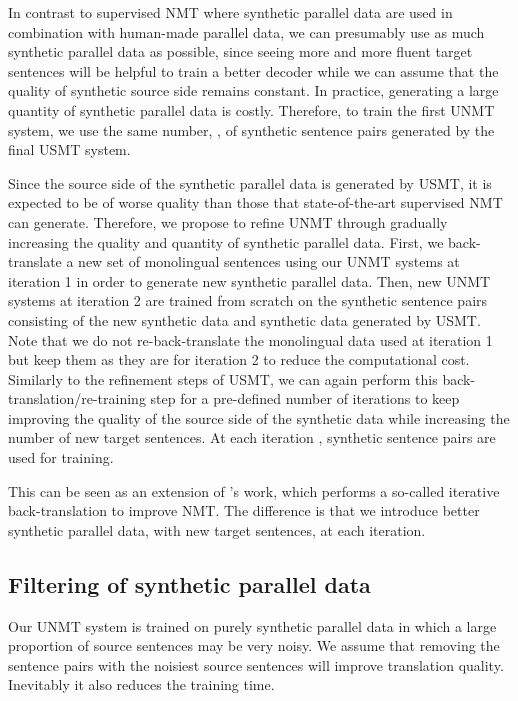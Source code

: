 \documentclass[11pt,a4paper]{article}
\begin{document}
In contrast to supervised NMT where synthetic parallel data are used in combination with human-made parallel data, we can presumably use as much synthetic parallel data as possible, since seeing more and more fluent target sentences will be helpful to train a better decoder while we can assume that the quality of synthetic source side remains constant. In practice, generating a large quantity of synthetic parallel data is costly. Therefore, to train the first UNMT system, we use the same number, , of synthetic sentence pairs generated by the final USMT system.

Since the source side of the synthetic parallel data is generated by USMT, it is expected to be of worse quality than those that state-of-the-art supervised NMT can generate. Therefore, we propose to refine UNMT through gradually increasing the quality and quantity of synthetic parallel data. First, we back-translate a new set of  monolingual sentences using our UNMT systems at iteration 1 in order to generate new synthetic parallel data. Then, new UNMT systems at iteration 2 are trained from scratch on the  synthetic sentence pairs consisting of the new  synthetic data and  synthetic data generated by USMT. Note that we do not re-back-translate the monolingual data used at iteration 1 but keep them as they are for iteration 2 to reduce the computational cost. Similarly to the refinement steps of USMT, we can again perform this back-translation/re-training step for a pre-defined number of iterations to keep improving the quality of the source side of the synthetic data while increasing the number of new target sentences. At each iteration ,  synthetic sentence pairs are used for training.

This can be seen as an extension of \citet{hoang-EtAl:2018:WNMT20181}'s work, which performs a so-called iterative back-translation to improve NMT. The difference is that we introduce better synthetic parallel data, with new target sentences, at each iteration.

\subsection{Filtering of synthetic parallel data}
\label{section:filternmt}
Our UNMT system is trained on purely synthetic parallel data in which a large proportion of source sentences may be very noisy. We assume that removing the sentence pairs with the noisiest source sentences will improve translation quality.  Inevitably it also reduces the training time.
\end{document}
